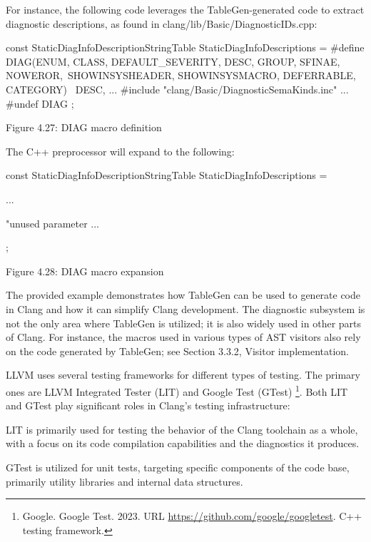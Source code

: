 For instance, the following code leverages the TableGen-generated code to extract diagnostic descriptions, as found in clang/lib/Basic/DiagnosticIDs.cpp:

\begin{cpp}
const StaticDiagInfoDescriptionStringTable StaticDiagInfoDescriptions = {
  #define DIAG(ENUM, CLASS, DEFAULT_SEVERITY, DESC, GROUP, SFINAE, NOWEROR,\
    SHOWINSYSHEADER, SHOWINSYSMACRO, DEFERRABLE, CATEGORY)    \
    DESC,
    ...
    #include "clang/Basic/DiagnosticSemaKinds.inc"
    ...
    #undef DIAG
};
\end{cpp}

\begin{center}
Figure 4.27: DIAG macro definition
\end{center}

The C++ preprocessor will expand to the following:

\begin{cpp}
const StaticDiagInfoDescriptionStringTable StaticDiagInfoDescriptions = {
    ...

    "unused parameter %
    ...
};
\end{cpp}

\begin{center}
Figure 4.28: DIAG macro expansion
\end{center}

The provided example demonstrates how TableGen can be used to generate code in Clang and how it can simplify Clang development. The diagnostic subsystem is not the only area where TableGen is utilized; it is also widely used in other parts of Clang. For instance, the macros used in various types of AST visitors also rely on the code generated by TableGen; see Section 3.3.2, Visitor implementation.

\mySubsubsection{4.5.2.}{LLVM test framework}

LLVM uses several testing frameworks for different types of testing. The primary ones are LLVM Integrated Tester (LIT) and Google Test (GTest) \footnote{Google. Google Test. 2023. URL \url{https://github.com/google/googletest}. C++ testing framework.}. Both LIT and GTest play significant roles in Clang's testing infrastructure:

LIT is primarily used for testing the behavior of the Clang toolchain as a whole, with a focus on its code compilation capabilities and the diagnostics it produces.

GTest is utilized for unit tests, targeting specific components of the code base, primarily utility libraries and internal data structures.

